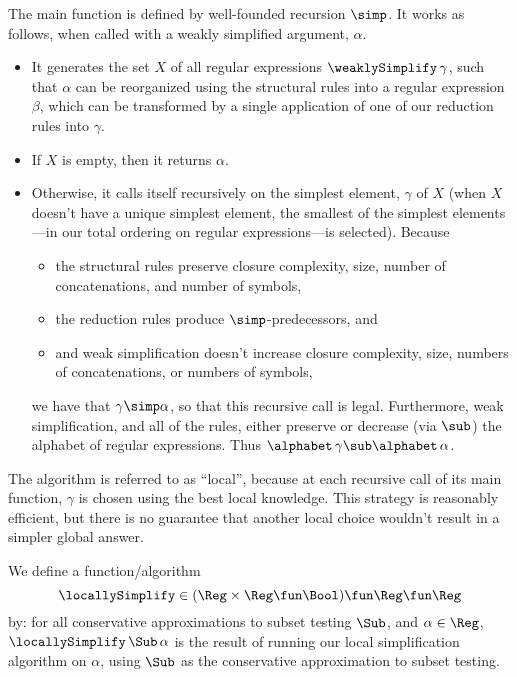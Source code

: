 The main function is defined by well-founded recursion $\simp$.  It
works as follows, when called with a weakly simplified argument,
$\alpha$.
\begin{itemize}
\item It generates the set $X$ of all regular expressions
  $\weaklySimplify\,\gamma$, such that $\alpha$ can be reorganized
  using the structural rules into a regular expression $\beta$,
  which can be transformed by a single application of one of our
  reduction rules into $\gamma$.

\item If $X$ is empty, then it returns $\alpha$.

\item Otherwise, it calls itself recursively on the simplest element,
  $\gamma$ of $X$ (when $X$ doesn't have a unique simplest element,
  the smallest of the simplest elements---in our total ordering on regular
  expressions---is selected).  Because
  \begin{itemize}
  \item the structural rules preserve closure complexity, size, number
    of concatenations, and number of symbols,

  \item the reduction rules produce $\simp$-predecessors, and

  \item and weak simplification doesn't increase closure complexity,
    size, numbers of concatenations, or numbers of symbols,
  \end{itemize}
  we have that $\gamma\simp\alpha$, so that this recursive call
  is legal.  Furthermore, weak simplification, and all of the rules,
  either preserve or decrease (via $\sub$) the alphabet of
  regular expressions.  Thus $\alphabet\,\gamma\sub\alphabet\,\alpha$.
\end{itemize}

The algorithm is referred to as ``local'', because at each recursive
call of its main function, $\gamma$ is chosen using the best local
knowledge.  This strategy is reasonably efficient, but there is no
guarantee that another local choice wouldn't result in a simpler
global answer.

We define a function/algorithm
\begin{displaymath}
\locallySimplify\in(\Reg\times\Reg\fun\Bool)\fun\Reg\fun\Reg
\end{displaymath}
by: for all conservative approximations to subset testing $\Sub$, and
$\alpha\in\Reg$, $\locallySimplify\,\Sub\,\alpha$ is the result of
running our local simplification algorithm on $\alpha$, using $\Sub$
as the conservative approximation to subset testing.


